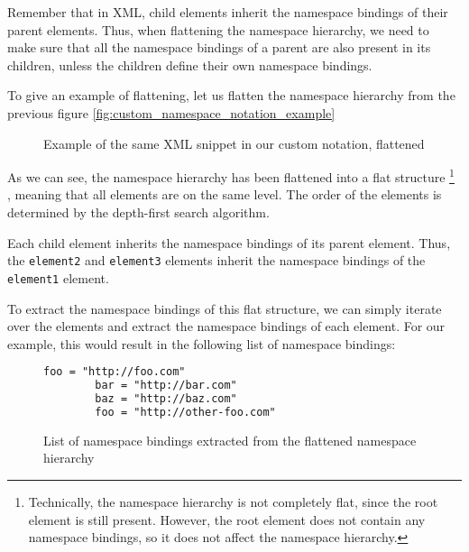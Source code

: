 Remember that in XML, child elements inherit the namespace bindings of their parent elements.
Thus, when flattening the namespace hierarchy, we need to make sure that
all the namespace bindings of a parent are also present in its children, 
unless the children define their own namespace bindings.

To give an example of flattening, let us flatten the namespace hierarchy from the previous figure \ref{fig:custom_namespace_notation_example}

\begin{figure}[H]
    \caption{Example of the same XML snippet in our custom notation, flattened}
    \label{fig:custom_namespace_notation_example_flattened}
\end{figure}

As we can see, the namespace hierarchy has been flattened into a flat structure
\footnote{Technically, the namespace hierarchy is not completely flat, since the root element is still present. However, the root element does not contain any namespace bindings, so it does not affect the namespace hierarchy.}
, meaning that all elements are on the same level.
The order of the elements is determined by the depth-first search algorithm.

Each child element inherits the namespace bindings of its parent element.
Thus, the \texttt{element2} and \texttt{element3} elements inherit the namespace bindings of the \texttt{element1} element.

To extract the namespace bindings of this flat structure, we can simply iterate over the elements and extract the namespace bindings of each element.
For our example, this would result in the following list of namespace bindings:

\begin{figure}[H]
    \caption{List of namespace bindings extracted from the flattened namespace hierarchy}
    \label{fig:custom_namespace_notation_example_flattened_extracted}
    \begin{lstlisting}[language=XML]
        foo = "http://foo.com"
        bar = "http://bar.com"
        baz = "http://baz.com"
        foo = "http://other-foo.com"
    \end{lstlisting}
\end{figure}

